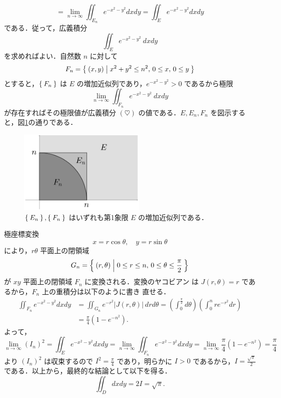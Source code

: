 \documentclass[11pt, uplatex, dvipdfmx]{jsarticle}
\newcommand{\ds}{\displaystyle}
\begin{document}
\begin{enumerate}[(1)]
\[       = \lim_{n \to \infty} \iint_{E_n} e^{-x^2-y^2} dx dy
       = \iint_{E} e^{-x^2-y^2} dx dy
     \]
     である．従って，広義積分
     \[\tag{$\heartsuit$}
       \iint_{E} e^{-x^2-y^2} \ dx dy
     \]
     を求めればよい．自然数 $n$ に対して
     \[
       F_n = \Set{ (x,y) | x^2+y^2 \leq n^2, \, 0 \leq x, \, 0 \leq y}
     \]
     とすると，$\Set{F_n}$ は $E$ の増加近似列であり，$e^{-x^2-y^2}>0$ であるから極限
     \[
       \lim_{n \to \infty} \iint_{F_n} e^{-x^2-y^2} \ dx dy
     \]
     が存在すればその極限値が広義積分 $(\heartsuit)$ の値である．$E, E_n, F_n$ を図示すると，図\ref{fig:no22EF}の通りである．
     \begin{figure}[h]
       \centering
       \includegraphics[height=4cm]{./pictures/no22EF.pdf}
       \caption{ $\Set{E_n}, \Set{F_n}$ はいずれも第1象限 $E$ の増加近似列である．}\label{fig:no22EF}
     \end{figure}


     極座標変換
     \[
       x=r\cos \theta, \quad y=r\sin \theta
     \]
     により，$r\theta$ 平面上の閉領域
     \[
       G_n =\Set{(r, \theta) | 0 \leq r \leq n, \, 0 \leq \theta \leq \frac{\pi}{2}}
     \]
     が $xy$ 平面上の閉領域 $F_n$ に変換される．変換のヤコビアン
     は $J(r, \theta)=r$ であるから，$F_n$ 上の重積分は以下のように書き
     直せる．
     \begin{align*}
       \iint_{F_n} e^{-x^2-y^2} dx dy 
       &= \iint_{G_n} e^{-r^2} |J(r,\theta)| \ dr d\theta 
         = \left( \int_{0}^{\frac{\pi}{2}} d\theta\right)\left(\int_{0}^{n}re^{-r^2} dr\right)\\
       & = \frac{\pi}{4}\left(1-e^{-n^2}\right).
     \end{align*}
     よって，
     \[
       \lim_{n \to \infty} \left(I_n\right)^2 = \iint_{E}e^{-x^2-y^2} dx dy 
       = \lim_{n \to \infty} \iint_{F_n} e^{-x^2-y^2} dx dy
       = \lim_{n \to \infty} \frac{\pi}{4}\left(1-e^{-n^2}\right) = \frac{\pi}{4}
     \]
     より $\left(I_n\right)^2$ は収束するので $\ds I^2 =
     \frac{\pi}{4}$ であり，明らかに $I>0$
     であるから，$\ds I=\frac{\sqrt{\pi}}{2}$ である．以上から，最終的な結論として以下を得る．
     \[
       \iint_{D} dx dy = 2 I = \sqrt{\pi}.
     \]


\end{enumerate}
\end{document}
